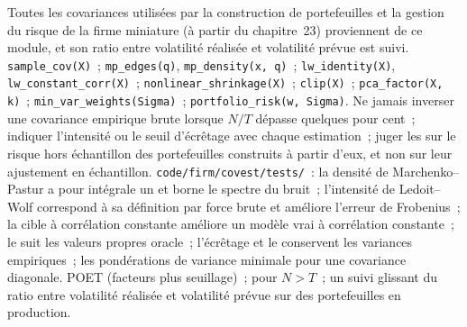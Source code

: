 \begin{build}
 Toutes les covariances utilisées par la construction de portefeuilles et la gestion du risque de la firme miniature (à partir du chapitre~23) proviennent de ce module, et son ratio entre volatilité réalisée et volatilité prévue est
suivi.
 \texttt{sample\_cov(X)}~; \texttt{mp\_edges(q)}, \texttt{mp\_density(x, q)}~; \texttt{lw\_identity(X)}, \texttt{lw\_constant\_corr(X)}~; \texttt{nonlinear\_shrinkage(X)}~;
\texttt{clip(X)}~; \texttt{pca\_factor(X, k)}~; \texttt{min\_var\_weights(Sigma)}~; \texttt{portfolio\_risk(w, Sigma)}.
 Ne jamais inverser une covariance empirique brute lorsque $N/T$ dépasse quelques pour cent~; indiquer l'intensité ou le seuil d'écrêtage avec chaque estimation~; juger les  sur
le risque hors échantillon des portefeuilles construits à partir d'eux, et non sur leur ajustement en échantillon.
 \texttt{code/firm/covest/tests/}~: la densité de Marchenko--Pastur a pour intégrale un et borne le spectre du bruit~; l'intensité de Ledoit--Wolf correspond à sa
définition par force brute et améliore l'erreur de Frobenius~; la cible à corrélation constante améliore un modèle vrai à corrélation constante~; le  suit les valeurs propres oracle~; l'écrêtage et le
 conservent les variances empiriques~; les pondérations de variance minimale pour une covariance diagonale.
 POET (facteurs plus seuillage)~;  pour $N > T$~; un suivi glissant du ratio entre volatilité réalisée et volatilité prévue sur des portefeuilles en production.
\end{build}

